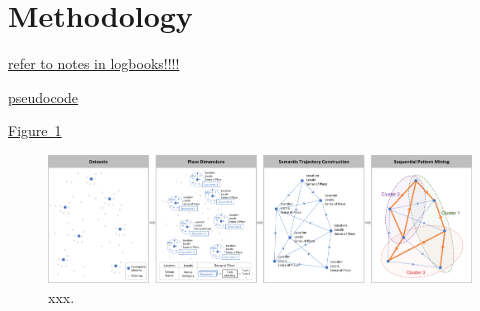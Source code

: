 \documentclass{article}
\begin{document}
\newpage


\section{Methodology}
\underline{refer to notes in logbooks!!!!}

\underline{pseudocode}

\underline{Figure~\ref{fig:flowchart}}
\begin{figure}
\centering
\includegraphics[width=1\textwidth]{figures/flowchart.png}
\caption{\label{fig:flowchart}xxx.}
\end{figure}
\end{document}
